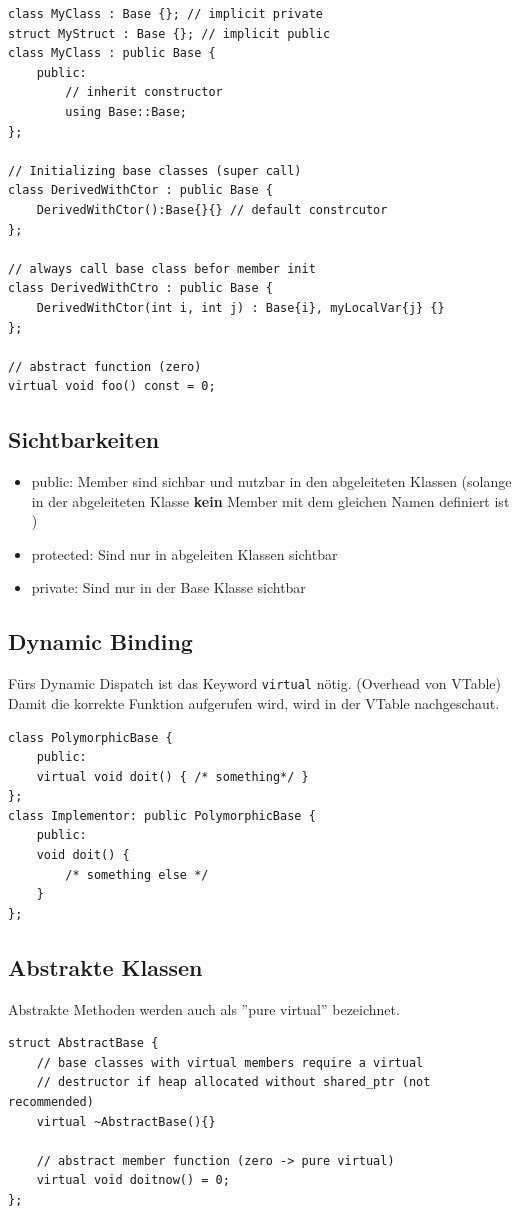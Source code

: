 \begin{lstlisting}
class MyClass : Base {}; // implicit private
struct MyStruct : Base {}; // implicit public
class MyClass : public Base {
	public: 
		// inherit constructor
		using Base::Base;
};

// Initializing base classes (super call)
class DerivedWithCtor : public Base {
	DerivedWithCtor():Base{}{} // default constrcutor
};

// always call base class befor member init
class DerivedWithCtro : public Base {
	DerivedWithCtor(int i, int j) : Base{i}, myLocalVar{j} {}
};

// abstract function (zero)
virtual void foo() const = 0; 
\end{lstlisting}

\subsection{Sichtbarkeiten}
\begin{itemize}
	\item public: Member sind sichbar und nutzbar in den abgeleiteten Klassen (solange in der abgeleiteten Klasse \textbf{kein} Member mit dem gleichen Namen definiert ist ) 
	\item protected: Sind nur in abgeleiten Klassen sichtbar
	\item private: Sind nur in der Base Klasse sichtbar
\end{itemize}

\clearpage

\subsection{Dynamic Binding}
Fürs Dynamic Dispatch ist das Keyword \lstinline|virtual| nötig. (Overhead von VTable) Damit die korrekte Funktion aufgerufen wird, wird in der VTable nachgeschaut.

\begin{lstlisting}
class PolymorphicBase {
	public:
	virtual void doit() { /* something*/ }
};
class Implementor: public PolymorphicBase {
	public:
	void doit() {
		/* something else */
	}
};
\end{lstlisting}

\subsection{Abstrakte Klassen}
Abstrakte Methoden werden auch als ''pure virtual'' bezeichnet.
\begin{lstlisting}
struct AbstractBase {
	// base classes with virtual members require a virtual 
	// destructor if heap allocated without shared_ptr (not recommended)
	virtual ~AbstractBase(){}
	
	// abstract member function (zero -> pure virtual)
	virtual void doitnow() = 0;
};
\end{lstlisting}

